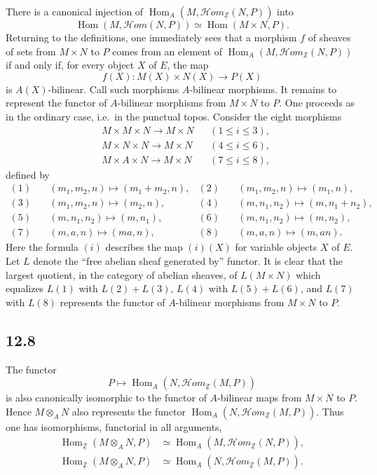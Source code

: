 \documentclass[11pt]{article}
\newcommand{\ZZ}{\mathbb{Z}}
\newcommand{\Hom}{\operatorname{Hom}}
\newcommand{\scrHom}{\mathscr{H}\!om}
\newcommand{\ie}{i.e.}
\begin{document}
There is a canonical injection of $\Hom_A(M,\scrHom_{\underline{\ZZ}}(N,P))$ into
\[
\Hom(M,\scrHom(N,P))\simeq \Hom(M\times N,P).
\]
Returning to the definitions, one immediately sees that a morphism $f$ of sheaves of sets from $M\times N$ to $P$ comes from an element of $\Hom_A(M,\scrHom_{\ZZ}(N,P))$ if and only if, for every object $X$ of $E$, the map
\[
f(X):M(X)\times N(X)\longrightarrow P(X)
\]
is $A(X)$-bilinear. Call such morphisms $A$-bilinear morphisms. It remains to represent the functor of $A$-bilinear morphisms from $M\times N$ to $P$. One proceeds as in the ordinary case, \ie\ in the punctual topos. Consider the eight morphisms
\begin{align*}
&M\times M\times N\longrightarrow M\times N &&(1\le i\le 3),\\
&M\times N\times N\longrightarrow M\times N &&(4\le i\le 6),\\
&M\times A\times N\longrightarrow M\times N &&(7\le i\le 8),
\end{align*}
defined by
\begin{align*}
(1)&\quad (m_1,m_2,n)\longmapsto(m_1+m_2,n),&
(2)&\quad (m_1,m_2,n)\longmapsto(m_1,n),\\
(3)&\quad (m_1,m_2,n)\longmapsto(m_2,n),&
(4)&\quad (m,n_1,n_2)\longmapsto(m,n_1+n_2),\\
(5)&\quad (m,n_1,n_2)\longmapsto(m,n_1),&
(6)&\quad (m,n_1,n_2)\longmapsto(m,n_2),\\
(7)&\quad (m,a,n)\longmapsto(ma,n),&
(8)&\quad (m,a,n)\longmapsto(m,an).
\end{align*}
Here the formula $(i)$ describes the map $(i)(X)$ for variable objects $X$ of $E$. Let $L$ denote the ``free abelian sheaf generated by'' functor. It is clear that the largest quotient, in the category of abelian sheaves, of $L(M\times N)$ which equalizes $L(1)$ with $L(2)+L(3)$, $L(4)$ with $L(5)+L(6)$, and $L(7)$ with $L(8)$ represents the functor of $A$-bilinear morphisms from $M\times N$ to $P$.

\subsection*{12.8}
The functor
\[
P\longmapsto \Hom_A(N,\scrHom_{\underline{\ZZ}}(M,P))
\]
is also canonically isomorphic to the functor of $A$-bilinear maps from $M\times N$ to $P$. Hence $M\otimes_A N$ also represents the functor $\Hom_A(N,\scrHom_{\underline{\ZZ}}(M,P))$. Thus one has isomorphisms, functorial in all arguments,
\begin{align}
\Hom_{\underline{\ZZ}}(M\otimes_A N,P)&\simeq \Hom_A(M,\scrHom_{\underline{\ZZ}}(N,P)),\tag{12.8.1}\\
\Hom_{\underline{\ZZ}}(M\otimes_A N,P)&\simeq \Hom_A(N,\scrHom_{\underline{\ZZ}}(M,P)).\tag{12.8.2}
\end{align}
\end{document}

